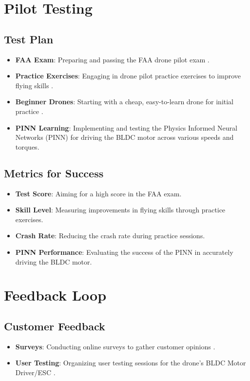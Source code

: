 \documentclass[12pt]{article}
\begin{document}
	
	\section{Pilot Testing}
		\subsection{Test Plan}
			\begin{itemize}
				\item \textbf{FAA Exam}: Preparing and passing the FAA drone pilot exam \cite{faa-exam}.
				\item \textbf{Practice Exercises}: Engaging in drone pilot practice exercises to improve flying skills \cite{practice-exercises}.
				\item \textbf{Beginner Drones}: Starting with a cheap, easy-to-learn drone for initial practice \cite{beginner-drones}.
				\item \textbf{PINN Learning}: Implementing and testing the Physics Informed Neural Networks (PINN) for driving the BLDC motor across various speeds and torques.
			\end{itemize}
		\subsection{Metrics for Success}
			\begin{itemize}
				\item \textbf{Test Score}: Aiming for a high score in the FAA exam.
				\item \textbf{Skill Level}: Measuring improvements in flying skills through practice exercises.
				\item \textbf{Crash Rate}: Reducing the crash rate during practice sessions.
				\item \textbf{PINN Performance}: Evaluating the success of the PINN in accurately driving the BLDC motor.
			\end{itemize}
	
	\section{Feedback Loop}
		\subsection{Customer Feedback}
			\begin{itemize}
				\item \textbf{Surveys}: Conducting online surveys to gather customer opinions \cite{enterprise-league}.
				\item \textbf{User Testing}: Organizing user testing sessions for the drone's BLDC Motor Driver/ESC \cite{wise-business-plans}.
			\end{itemize}
\end{document}
